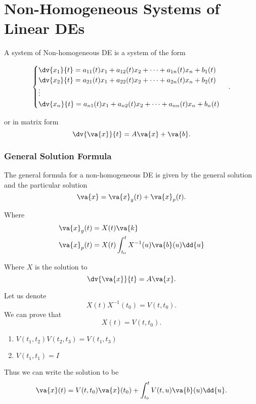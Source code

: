 \part{Non-Homogeneous Systems of Linear DEs}

A system of Non-homogeneous DE is a system of the form

\[
	\begin{cases}
		\dv{x_1}{t} = a_{11}(t)x_1+a_{12}(t)x_2+\cdots+a_{1n}(t)x_n + b_1(t) \\
		\dv{x_2}{t} = a_{21}(t)x_1+a_{22}(t)x_2+\cdots+a_{2n}(t)x_n + b_2(t) \\
		\vdots                                                               \\
		\dv{x_n}{t} = a_{n1}(t)x_1+a_{n2}(t)x_2+\cdots+a_{nn}(t)x_n + b_n(t) \\
	\end{cases}
	.\]

or in matrix form
\[
	\dv{\va{x}}{t} = A \va{x} + \va{b}
	.\]


\section{General Solution Formula}
The general formula for a non-homogeneous DE is given by the general solution and the particular solution
\[
	\va{x} = \va{x}_g(t) + \va{x}_p(t)
	.\]

Where
\begin{align*}
	\va{x}_g(t) & = X(t)\va{k}                                    \\
	\va{x}_p(t) & = X(t) \int_{t_0}^t  X^{-1}(u) \va{b}(u) \dd{u} \\
\end{align*}

Where $X$ is the solution to
\[
	\dv{\va{x}}{t} =A\va{x}
	.\]

Let us denote
\[
	X(t)X^{-1}(t_0)=V(t,t_0)
	.\]
We can prove that
\[
	X(t) = V(t,t_0)
	.\]
\begin{remark}
	\begin{enumerate}
		\item $V(t_1,t_2)V(t_2,t_3)=V(t_1,t_3)$
		\item $V(t_1,t_1)=I$
	\end{enumerate}
\end{remark}

Thus we can write the solution to be
\[
	\va{x}(t) = V(t,t_0)\va{x}(t_0) +\int_{t_0}^t V(t,u)\va{b}(u) \dd{u}
	.\]

